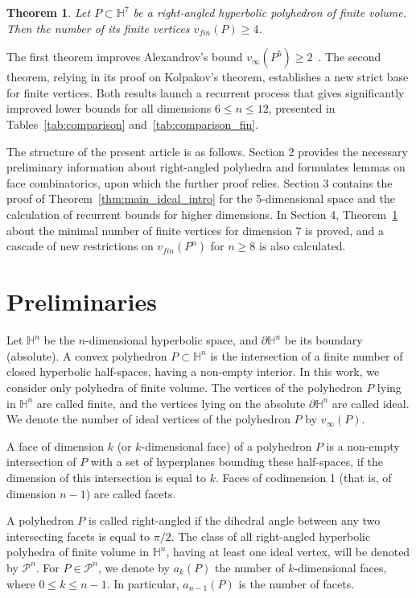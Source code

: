 \documentclass[12pt]{amsart}
\newtheorem{theorem}{Theorem}[section]
\theoremstyle{definition}
\begin{document}
	\begin{theorem} \label{thm:main_fin_intro}
		Let $P \subset \mathbb{H}^7$ be a right-angled hyperbolic polyhedron of finite volume. Then the number of its finite vertices $v_{fin}(P) \ge 4$.
	\end{theorem}
	
	The first theorem improves Alexandrov's bound $v_\infty(P^5) \geq 2$~\cite{Ale23}. The second theorem, relying in its proof on Kolpakov's theorem, establishes a new strict base for finite vertices. Both results launch a recurrent process that gives significantly improved lower bounds for all dimensions $6 \leq n \leq 12$, presented in Tables~\ref{tab:comparison} and~\ref{tab:comparison_fin}.
	
	The structure of the present article is as follows. Section 2 provides the necessary preliminary information about right-angled polyhedra and formulates lemmas on face combinatorics, upon which the further proof relies. Section 3 contains the proof of Theorem~\ref{thm:main_ideal_intro} for the 5-dimensional space and the calculation of recurrent bounds for higher dimensions. In Section 4, Theorem~\ref{thm:main_fin_intro} about the minimal number of finite vertices for dimension 7 is proved, and a cascade of new restrictions on $v_{fin}(P^n)$ for $n \ge 8$ is also calculated.
	
	\section{Preliminaries}
	
	Let $\mathbb{H}^n$ be the $n$-dimensional hyperbolic space, and $\partial\mathbb{H}^n$ be its boundary (absolute). A convex polyhedron $P \subset \mathbb{H}^n$ is the intersection of a finite number of closed hyperbolic half-spaces, having a non-empty interior. In this work, we consider only polyhedra of finite volume. The vertices of the polyhedron $P$ lying in $\mathbb{H}^n$ are called finite, and the vertices lying on the absolute $\partial\mathbb{H}^n$ are called ideal. We denote the number of ideal vertices of the polyhedron $P$ by $v_\infty(P)$.
	
	A face of dimension $k$ (or $k$-dimensional face) of a polyhedron $P$ is a non-empty intersection of $P$ with a set of hyperplanes bounding these half-spaces, if the dimension of this intersection is equal to $k$. Faces of codimension 1 (that is, of dimension $n-1$) are called facets.
	
	A polyhedron $P$ is called right-angled if the dihedral angle between any two intersecting facets is equal to $\pi/2$. The class of all right-angled hyperbolic polyhedra of finite volume in $\mathbb{H}^n$, having at least one ideal vertex, will be denoted by $\mathcal{P}^n$. For $P \in \mathcal{P}^n$, we denote by $a_k(P)$ the number of $k$-dimensional faces, where $0 \le k \le n-1$. In particular, $a_{n-1}(P)$ is the number of facets.
	
\end{document}
